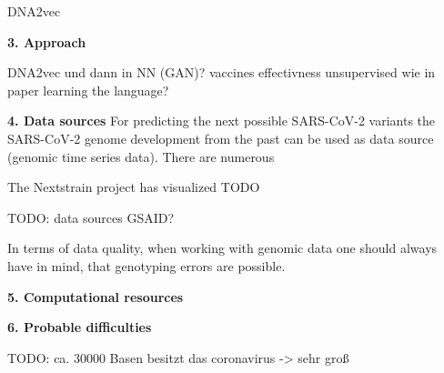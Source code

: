 DNA2vec \cite{ng2017dna2vec}


\textbf{3. Approach}

DNA2vec und dann in NN (GAN)?
vaccines effectivness unsupervised wie in paper learning the language?

\textbf{4. Data sources}
For predicting the next possible SARS-CoV-2 variants the SARS-CoV-2 genome development from the past can be used as data source (genomic time series data). There are numerous 

The Nextstrain project has visualized TODO

TODO: data sources GSAID?

In terms of data quality, when working with genomic data one should always have in mind, that genotyping errors are possible.


\textbf{5. Computational resources}

\textbf{6. Probable difficulties}

TODO: ca. 30000 Basen besitzt das coronavirus -> sehr groß

\newpage
